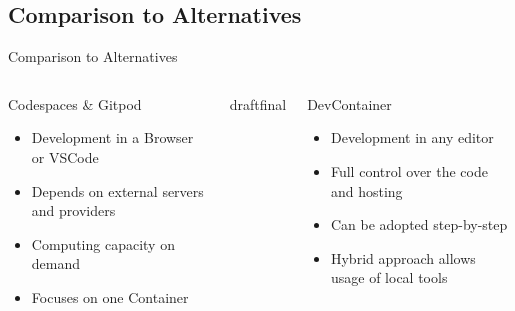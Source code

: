 \documentclass{beamer}
\def\final{final}
\def\status{draft}
\begin{document}
\subsection{Comparison to Alternatives}
\begin{frame}
  \vspace{-.7cm}
  \begin{center}
    \Large Comparison to Alternatives
  \end{center}


  \begin{columns}[totalwidth=\textwidth]
    \begin{column}{0.45\textwidth}
      \begin{center}
        {\large\color{uos-red-full}Codespaces \& Gitpod}
      \end{center}
      \begin{itemize}
        \setlength\itemsep{0.6em}
        \item Development in a Browser or VSCode
        \item Depends on external servers and providers
        \item Computing capacity on demand
        \item Focuses on one Container
      \end{itemize}
    \end{column}

    \ifx\status\final{}
      \pause{}
    \fi
    \hspace{1cm}
    \begin{column}{0.45\textwidth}
      \begin{center}
        {\large\color{uos-red-full}DevContainer}
      \end{center}
      \begin{itemize}
        \setlength\itemsep{0.6em}
        \item Development in any editor
        \item Full control over the code and hosting
        \item Can be adopted step-by-step
        \item Hybrid approach allows usage of local tools
      \end{itemize}
    \end{column}


  \end{columns}
\end{frame}
\end{document}
